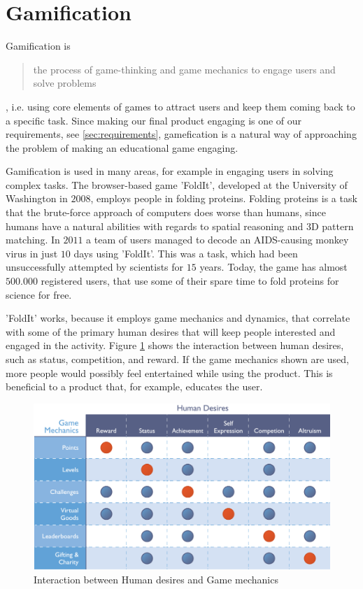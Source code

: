 \section{Gamification}
\label{sec:gamification}
Gamification is 
\begin{quote}
	the process of game-thinking and game mechanics to engage users and solve problems
\end{quote}
\cite{Zichermann2011}, i.e. using core elements of games to attract users and keep them coming back to a specific task.
Since making our final product engaging is one of our requirements, see \autoref{sec:requirements}, gamefication is a natural way of approaching the problem of making an educational game engaging.\newline

Gamification is used in many areas, for example in engaging users in solving complex tasks.
The browser-based game 'FoldIt', developed at the University of Washington in $2008$, employs people in folding proteins.
Folding proteins is a task that the brute-force approach of computers does worse than humans, since humans have a natural abilities with regards to spatial reasoning and 3D pattern matching.
In $2011$ a team of users managed to decode an AIDS-causing monkey virus in just $10$ days using 'FoldIt'.
This was a task, which had been unsuccessfully attempted by scientists for $15$ years.\cite{Huff2011}
Today, the game has almost $500.000$ registered users, that use some of their spare time to fold proteins for science for free.\cite{FoldIt2013}\newline

'FoldIt' works, because it employs game mechanics and dynamics, that correlate with some of the primary human desires that will keep people interested and engaged in the activity.
Figure \ref{fig:bunchball} shows the interaction between human desires, such as status, competition, and reward.
If the game mechanics shown are used, more people would possibly feel entertained while using the product.
This is beneficial to a product that, for example, educates the user. 

\begin{figure}[h]
  \centering
    \includegraphics[width=\textwidth]{img/bunchball.png}
  \caption{Interaction between Human desires and Game mechanics}
  \label{fig:bunchball}
\end{figure}

